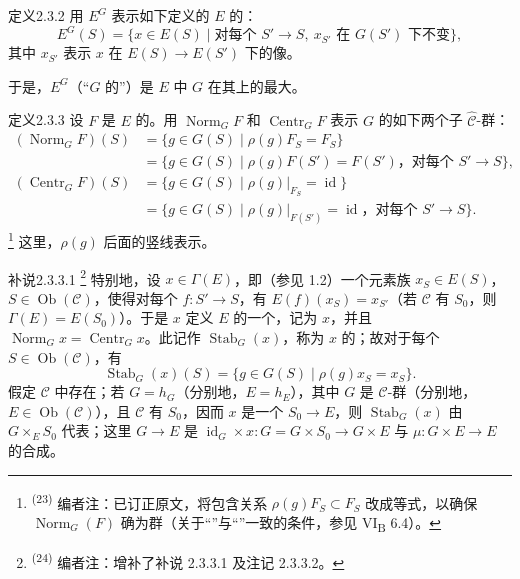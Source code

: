 \begin{SGAresult}{定义}{2.3.2}
用 $E^G$ 表示如下定义的 $E$ 的：
\[
E^G(S)=\{x\in E(S)\mid \text{对每个 }S'\to S,\ x_{S'}\text{ 在 }G(S')\text{ 下不变}\},
\]
其中 $x_{S'}$ 表示 $x$ 在 $E(S)\to E(S')$ 下的像。
\end{SGAresult}
于是，$E^G$（“$G$ 的”）是 $E$ 中 $G$ 在其上的最大。

\begin{SGAresult}{定义}{2.3.3}
设 $F$ 是 $E$ 的。用 $\operatorname{Norm}_GF$ 和 $\operatorname{Centr}_GF$ 表示 $G$ 的如下两个子 $\widehat{\mathcal C}$-群：
\[
\begin{aligned}
(\operatorname{Norm}_GF)(S)
&=\{g\in G(S)\mid\rho(g)F_S=F_S\}\\
&=\{g\in G(S)\mid\rho(g)F(S')=F(S')\text{，对每个 }S'\to S\},\\
(\operatorname{Centr}_GF)(S)
&=\{g\in G(S)\mid\rho(g)|_{F_S}=\operatorname{id}\}\\
&=\{g\in G(S)\mid\rho(g)|_{F(S')}=\operatorname{id}\text{，对每个 }S'\to S\}.
\end{aligned}
\]
\footnote{\textsuperscript{(23)} 编者注：已订正原文，将包含关系 $\rho(g)F_S\subset F_S$ 改成等式，以确保 $\operatorname{Norm}_G(F)$ 确为群（关于“”与“”一致的条件，参见 VI\textsubscript{B} 6.4）。}
这里，$\rho(g)$ 后面的竖线表示。
\end{SGAresult}
\begin{SGAresult}{补说}{2.3.3.1}
\footnote{\textsuperscript{(24)} 编者注：增补了补说 2.3.3.1 及注记 2.3.3.2。}
特别地，设 $x\in\Gamma(E)$，即（参见 1.2）一个元素族 $x_S\in E(S)$，$S\in\operatorname{Ob}(\mathcal C)$，使得对每个 $f:S'\to S$，有 $E(f)(x_S)=x_{S'}$（若 $\mathcal C$ 有 $S_0$，则 $\Gamma(E)=E(S_0)$）。于是 $x$ 定义 $E$ 的一个，记为 $x$，并且 $\operatorname{Norm}_Gx=\operatorname{Centr}_Gx$。此记作 $\operatorname{Stab}_G(x)$，称为 $x$ 的；故对于每个 $S\in\operatorname{Ob}(\mathcal C)$，有
\[
\operatorname{Stab}_G(x)(S)=\{g\in G(S)\mid\rho(g)x_S=x_S\}.
\]
假定 $\mathcal C$ 中存在；若 $G=h_G$（分别地，$E=h_E$），其中 $G$ 是 $\mathcal C$-群（分别地，$E\in\operatorname{Ob}(\mathcal C)$），且 $\mathcal C$ 有 $S_0$，因而 $x$ 是一个 $S_0\to E$，则 $\operatorname{Stab}_G(x)$ 由 $G\times_ES_0$ 代表；这里 $G\to E$ 是 $\operatorname{id}_G\times x:G=G\times S_0\to G\times E$ 与 $\mu:G\times E\to E$ 的合成。
\end{SGAresult}
